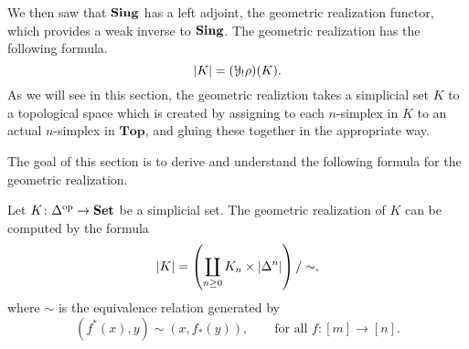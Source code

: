 \documentclass[main.tex]{subfiles}
\begin{document}
We then saw that $\mathbf{Sing}$ has a left adjoint, the geometric realization functor, which provides a weak inverse to $\mathbf{Sing}$. The geometric realization has the following formula.
\begin{equation*}
  {| K |} = (\mathcal{Y}_{!}\rho)(K).
\end{equation*}
As we will see in this section, the geometric realiztion takes a simplicial set $K$ to a topological space which is created by assigning to each $n$-simplex in $K$ to an actual $n$-simplex in $\mathbf{Top}$, and gluing these together in the appropriate way.

The goal of this section is to derive and understand the following formula for the geometric realization.

\begin{theorem}
  \label{thm:formula_for_geometric_realization}
  Let $K\colon \Delta^{\mathrm{op}} \to \mathbf{Set}$ be a simplicial set. The geometric realization of $K$ can be computed by the formula
  \begin{equation*}
    {| K |} = \left( \coprod_{n \geq 0} K_{n} \times {| \Delta^{n} |} \right) /\sim,
  \end{equation*}
  where $\sim$ is the equivalence relation generated by
  \begin{equation*}
    (f^{*}(x), y) \sim (x, f_{*}(y)),\qquad \text{for all } f\colon[m] \to [n].
  \end{equation*}
\end{theorem}
\end{document}
